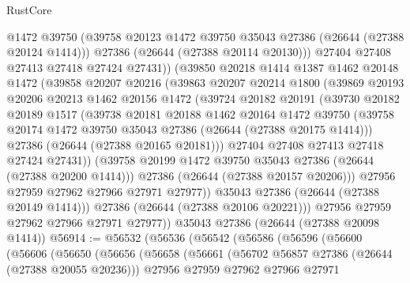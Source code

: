 \begin{lexlean}{RustCore}
\begin{coremodule}
                @1472
                @39750
                (@39758 @20123 @1472 @39750 @35043 @27386 (@26644 (@27388 @20124 @1414)))
                @27386
                (@26644 (@27388 @20114 @20130)))
              @27404
              @27408
              @27413
              @27418
              @27424
              @27431))
          (@39850
            @20218
            @1414
            @1387
            @1462
            @20148
            @1472
            (@39858
              @20207
              @20216
              (@39863
                @20207
                @20214
                @1800
                (@39869
                  @20193
                  @20206
                  @20213
                  @1462
                  @20156
                  @1472
                  (@39724
                    @20182
                    @20191
                    (@39730
                      @20182
                      @20189
                      @1517
                      (@39738
                        @20181
                        @20188
                        @1462
                        @20164
                        @1472
                        @39750
                        (@39758 @20174 @1472 @39750 @35043 @27386 (@26644 (@27388 @20175 @1414)))
                        @27386
                        (@26644 (@27388 @20165 @20181)))
                      @27404
                      @27408
                      @27413
                      @27418
                      @27424
                      @27431))
                  (@39758 @20199 @1472 @39750 @35043 @27386 (@26644 (@27388 @20200 @1414)))
                  @27386
                  (@26644 (@27388 @20157 @20206)))
                @27956
                @27959
                @27962
                @27966
                @27971
                @27977))
            @35043
            @27386
            (@26644 (@27388 @20149 @1414)))
          @27386
          (@26644 (@27388 @20106 @20221)))
        @27956
        @27959
        @27962
        @27966
        @27971
        @27977))
    @35043
    @27386
    (@26644 (@27388 @20098 @1414))
@56914 := @56532
    (@56536
      (@56542
        (@56586
          (@56596
            (@56600
              (@56606
                (@56650
                  (@56656
                    (@56658
                      (@56661
                        (@56702 @56857 @27386 (@26644 (@27388 @20055 @20236)))
                        @27956
                        @27959
                        @27962
                        @27966
                        @27971

\end{coremodule}
\end{lexlean}
